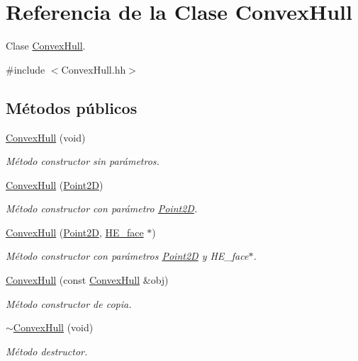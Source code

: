 \hypertarget{class_convex_hull}{\section{Referencia de la Clase Convex\-Hull}
\label{class_convex_hull}
}


Clase \hyperlink{class_convex_hull}{Convex\-Hull}.  




{\ttfamily \#include $<$Convex\-Hull.\-hh$>$}

\subsection*{Métodos públicos}
\begin{DoxyCompactItemize}
\item 
\hyperlink{class_convex_hull_a41e888f95597a80d42a90060e1dba114}{Convex\-Hull} (void)
\begin{DoxyCompactList}\small\item\em Método constructor sin parámetros. \end{DoxyCompactList}\item 
\hyperlink{class_convex_hull_ab35ffd84a05135cf8e4c6f98db103274}{Convex\-Hull} (\hyperlink{class_point2_d}{Point2\-D})
\begin{DoxyCompactList}\small\item\em Método constructor con parámetro \hyperlink{class_point2_d}{Point2\-D}. \end{DoxyCompactList}\item 
\hyperlink{class_convex_hull_a3c2424e4f2e68b38285a236ea33014fe}{Convex\-Hull} (\hyperlink{class_point2_d}{Point2\-D}, \hyperlink{class_h_e__face}{H\-E\-\_\-face} $\ast$)
\begin{DoxyCompactList}\small\item\em Método constructor con parámetros \hyperlink{class_point2_d}{Point2\-D} y H\-E\-\_\-face$\ast$. \end{DoxyCompactList}\item 
\hyperlink{class_convex_hull_abd4e80afef71c40593d8c50233bde05d}{Convex\-Hull} (const \hyperlink{class_convex_hull}{Convex\-Hull} \&obj)
\begin{DoxyCompactList}\small\item\em Método constructor de copia. \end{DoxyCompactList}\item 
\hypertarget{class_convex_hull_ada73a790143a97f4dfe13580c026c6db}{\hyperlink{class_convex_hull_ada73a790143a97f4dfe13580c026c6db}{$\sim$\-Convex\-Hull} (void)}\label{class_convex_hull_ada73a790143a97f4dfe13580c026c6db}

\begin{DoxyCompactList}\small\item\em Método destructor. \end{DoxyCompactList}\end{DoxyCompactItemize}
